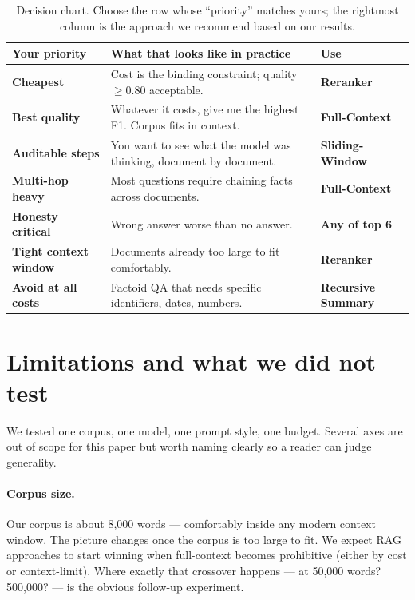 \documentclass[11pt,a4paper]{article}
\begin{document}
\begin{table}[t]
\centering
\small
\begin{tabularx}{\columnwidth}{>{\bfseries}lXl}
\toprule
Your priority & What that looks like in practice & Use \\
\midrule
Cheapest & Cost is the binding constraint; quality $\geq 0.80$ acceptable. & \textbf{Reranker} \\
Best quality & Whatever it costs, give me the highest F1. Corpus fits in context. & \textbf{Full-Context} \\
Auditable steps & You want to see what the model was thinking, document by document. & \textbf{Sliding-Window} \\
Multi-hop heavy & Most questions require chaining facts across documents. & \textbf{Full-Context} \\
Honesty critical & Wrong answer worse than no answer. & \textbf{Any of top 6} \\
Tight context window & Documents already too large to fit comfortably. & \textbf{Reranker} \\
Avoid at all costs & Factoid QA that needs specific identifiers, dates, numbers. & \textbf{Recursive Summary} \\
\bottomrule
\end{tabularx}
\caption{Decision chart. Choose the row whose ``priority'' matches yours; the rightmost column is the approach we recommend based on our results.}
\label{tab:rec}
\end{table}

\section{Limitations and what we did not test}

We tested one corpus, one model, one prompt style, one budget. Several axes are out of scope for this paper but worth naming clearly so a reader can judge generality.

\paragraph{Corpus size.} Our corpus is about 8{,}000 words — comfortably inside any modern context window. The picture changes once the corpus is too large to fit. We expect RAG approaches to start winning when full-context becomes prohibitive (either by cost or context-limit). Where exactly that crossover happens — at 50{,}000 words? 500{,}000? — is the obvious follow-up experiment.
\end{document}
